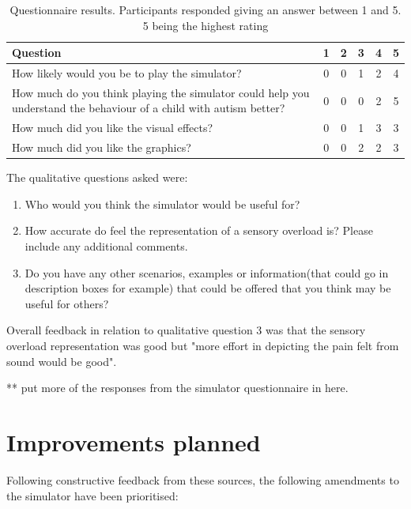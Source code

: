 \documentclass[11pt]{report}
\begin{document}
\begin{table}
\caption{Questionnaire results. Participants responded giving an answer between 1 and 5. 5 being the highest rating}
\begin{tabular}{| p{9cm} | c c c c c |}
\hline
\textbf{Question} & 1 & 2 & 3 & 4 & 5 \\
\hline
How likely would you be to play the simulator? & 0 & 0 & 1 & 2 & 4 \\
\hline
How much do you think playing the simulator could help you understand the behaviour of a child with autism better? & 0 & 0 & 0 & 2 & 5 \\
\hline
How much did you like the visual effects? & 0 & 0 & 1 & 3 & 3 \\
\hline
How much did you like the graphics? & 0 & 0 & 2 & 2 & 3 \\ 
\hline
\end{tabular}
\end{table}

The qualitative questions asked were:
\begin{enumerate}
\item Who would you think the simulator would be useful for?
\item How accurate do feel the representation of a sensory overload is? Please include any additional comments.
\item Do you have any other scenarios, examples or information(that could go in description boxes for example) that could be offered that you think may be useful for others?
\end{enumerate}

Overall feedback in relation to qualitative question 3 was that the sensory overload representation was good but "more effort in depicting the pain felt from sound would be good". 

** put more of the responses from the simulator questionnaire in here.

\section{Improvements planned}
Following constructive feedback from these sources, the following amendments to the simulator have been prioritised:
\end{document}
